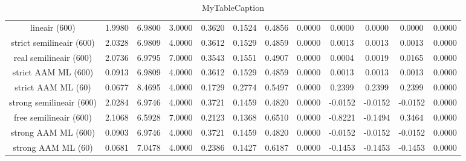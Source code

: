 \begin{table}
\centering
\begin{tabular}{|c|c|c|c|c|c|c|c|c|c|c|c|}
\hline
 &  &  &  &  &  &  &  &  &  &  &  \\
\hline
lineair (600) & 1.9980 & 6.9800 & 3.0000 & 0.3620 & 0.1524 & 0.4856 & 0.0000 & 0.0000 & 0.0000 & 0.0000 & 0.0000 \\
\hline
strict semilineair (600) & 2.0328 & 6.9809 & 4.0000 & 0.3612 & 0.1529 & 0.4859 & 0.0000 & 0.0013 & 0.0013 & 0.0013 & 0.0000 \\
\hline
real semilineair (600) & 2.0736 & 6.9795 & 7.0000 & 0.3543 & 0.1551 & 0.4907 & 0.0000 & 0.0004 & 0.0019 & 0.0165 & 0.0000 \\
\hline
strict AAM ML (600) & 0.0913 & 6.9809 & 4.0000 & 0.3612 & 0.1529 & 0.4859 & 0.0000 & 0.0013 & 0.0013 & 0.0013 & 0.0000 \\
\hline
strict AAM ML (60) & 0.0677 & 8.4695 & 4.0000 & 0.1729 & 0.2774 & 0.5497 & 0.0000 & 0.2399 & 0.2399 & 0.2399 & 0.0000 \\
\hline
strong semilineair (600) & 2.0284 & 6.9746 & 4.0000 & 0.3721 & 0.1459 & 0.4820 & 0.0000 & -0.0152 & -0.0152 & -0.0152 & 0.0000 \\
\hline
free semilineair (600) & 2.1068 & 6.5928 & 7.0000 & 0.2123 & 0.1368 & 0.6510 & 0.0000 & -0.8221 & -0.1494 & 0.3464 & 0.0000 \\
\hline
strong AAM ML (600) & 0.0903 & 6.9746 & 4.0000 & 0.3721 & 0.1459 & 0.4820 & 0.0000 & -0.0152 & -0.0152 & -0.0152 & 0.0000 \\
\hline
strong AAM ML (60) & 0.0681 & 7.0478 & 4.0000 & 0.2386 & 0.1427 & 0.6187 & 0.0000 & -0.1453 & -0.1453 & -0.1453 & 0.0000 \\
\hline
\end{tabular}
\caption{MyTableCaption}
\label{table:MyTableLabel}
\end{table}

